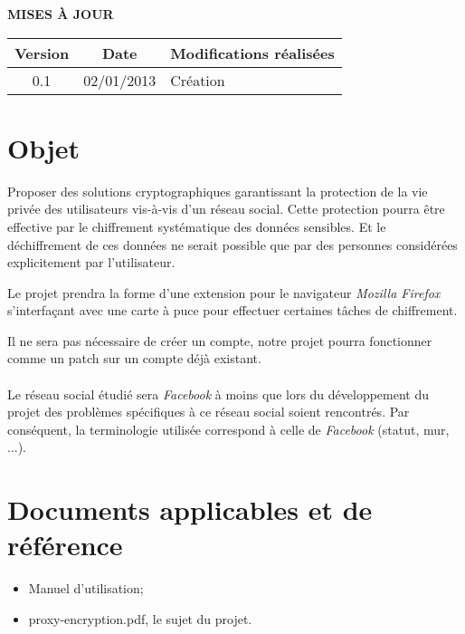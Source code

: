 \documentclass[a4paper,11pt,french]{article}
\begin{document}
\makeFirstPage
\clearpage
\vspace*{1cm}
\begin{center}
\textbf{\huge{MISES À JOUR}}\\
\vspace*{3cm}
	\begin{tabularx}{16cm}{|c|c|X|}
	\hline
	\bfseries{Version} & \bfseries{Date} & \bfseries{Modifications réalisées}\\
	\hline
	0.1 & 02/01/2013 & Création\\
	\hline
	\end{tabularx}
\end{center}

\clearpage
\tableofcontents
\clearpage


\section{Objet}
\renewcommand\labelitemi{\textbullet} %
\renewcommand\labelitemii{$\circ$} %
Proposer des solutions cryptographiques garantissant la protection de la vie 
privée des utilisateurs vis-à-vis d'un réseau social. Cette protection pourra
être effective par le chiffrement systématique des données sensibles. Et
le déchiffrement de ces données ne serait possible que par des personnes
considérées explicitement par l'utilisateur.

Le projet prendra la forme d'une extension pour le navigateur 
\emph{Mozilla Firefox}
s'interfaçant avec une carte à puce pour effectuer certaines tâches de 
chiffrement.

Il ne sera pas nécessaire de créer un compte, notre projet pourra fonctionner 
comme un patch sur un compte déjà existant.

\paragraph{}
Le réseau social étudié sera \emph{Facebook} à moins que lors du développement
du projet des problèmes spécifiques à ce réseau social soient rencontrés. 
Par conséquent, la terminologie utilisée correspond à celle de \emph{Facebook} 
(statut, mur, ...).

\section{Documents applicables et de référence}
\begin{itemize}
    \item Manuel d'utilisation;
    \item proxy-encryption.pdf, le sujet du projet.
\end{itemize}
\end{document}
